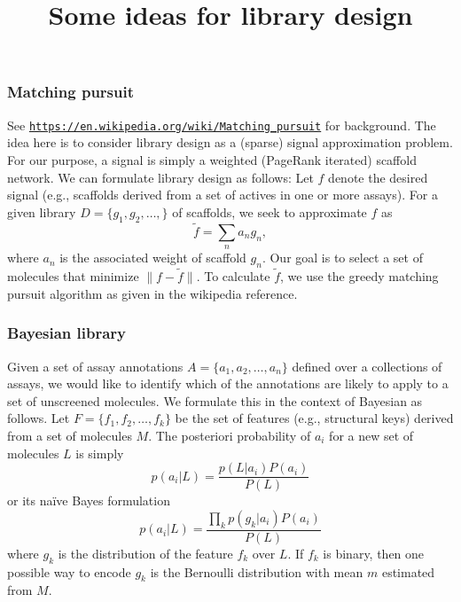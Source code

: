 \documentclass{beamer}
\title{Some ideas for library design}
\begin{document}
\begin{frame}
  \titlepage
\end{frame}

\begin{frame}
  \frametitle{Matching pursuit}
  See
  \href{https://en.wikipedia.org/wiki/Matching\_pursuit}{\texttt{https://en.wikipedia.org/wiki/Matching\_pursuit}}
  for background. The idea here is to consider library design as a
  (sparse) signal approximation problem. For our purpose, a signal is
  simply a weighted (PageRank iterated) scaffold network. We can
  formulate library design as follows: Let $f$ denote the desired
  signal (e.g., scaffolds derived from a set of actives in one or more
  assays). For a given library $D = \{g_1, g_2, \ldots,\}$ of
  scaffolds, we seek to approximate $f$ as
  \[ \tilde{f} = \sum_n a_ng_n,\]
  where $a_n$ is the associated weight of scaffold $g_n$. Our goal is
  to select a set of molecules that minimize $\|f - \tilde{f}\|$. To
  calculate $\tilde{f}$, we use the greedy matching pursuit algorithm
  as given in the wikipedia reference.
\end{frame}

\begin{frame}
  \frametitle{Bayesian library}
  Given a set of assay annotations $A =\{a_1,a_2,\ldots,a_n\}$ defined
  over a collections of assays, we would like to identify which of the
  annotations are likely to apply to a set of unscreened molecules. We
  formulate this in the context of Bayesian as follows. Let $F =
  \{f_1, f_2, \ldots, f_k\}$ be the set of features (e.g., 
  structural keys) derived from a set of molecules $M$. The
  posteriori probability of $a_i$ for a new set of molecules $L$ is simply
  \[ p(a_i | L) = \frac{p(L|a_i)P(a_i)}{P(L)}\]
  or its na\"ive Bayes formulation
  \[ p(a_i|L) = \frac{\prod_kp(g_k|a_i)P(a_i)}{P(L)}\]
  where $g_k$ is the distribution of the feature $f_k$ over $L$. If
  $f_k$ is binary, then one possible way to encode $g_k$ is the
  Bernoulli distribution with mean $m$ estimated from $M$.
\end{frame}
\end{document}
